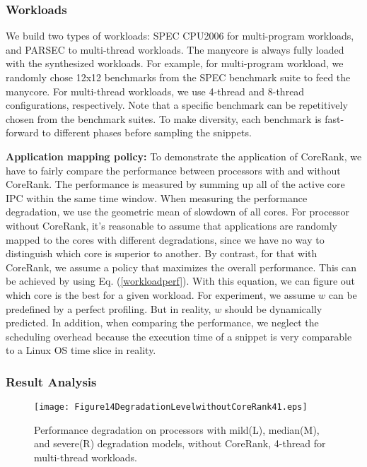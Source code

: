 \subsubsection{Workloads}
We  build two types of workloads: SPEC CPU2006 for multi-program workloads, and PARSEC to multi-thread workloads.  The manycore is always fully loaded with the synthesized workloads. For example, for multi-program workload, we randomly chose 12x12 benchmarks from the SPEC benchmark suite to feed the manycore.   For multi-thread workloads, we use 4-thread and 8-thread configurations, respectively.   Note that a specific benchmark can be repetitively chosen from the benchmark suites. To make diversity, each benchmark is fast-forward to different phases before sampling the snippets.


\textbf{Application mapping policy:} To demonstrate the application of CoreRank, we have to fairly compare the performance between processors with and without CoreRank.  The performance is measured by summing up all of the active core IPC within the same time window. When measuring the performance degradation, we use the geometric mean of slowdown of all cores.  For processor without CoreRank, it's reasonable to assume that applications are randomly mapped to the cores with different degradations, since we have no way to distinguish which core is superior to another. By contrast, for that with CoreRank, we assume a policy that maximizes the overall performance. This can be achieved by using Eq. (\ref{workloadperf}). With this equation, we can figure out  which core is the best for a given workload. For experiment, we assume $w$ can be predefined by a perfect profiling. But in reality, $w$ should be dynamically predicted. In addition, when comparing the performance, we neglect the scheduling overhead because the execution time of a snippet is very comparable to a Linux OS time slice in reality.

\subsubsection{Result Analysis}
\begin{figure*}[t]
 \centering
  \texttt{[image: Figure14DegradationLevelwithoutCoreRank41.eps]}\\
\caption{Performance degradation on processors with mild(L), median(M), and severe(R) degradation models,  without CoreRank,  4-thread for multi-thread workloads.}
\label{comp2}
\end{figure*}

